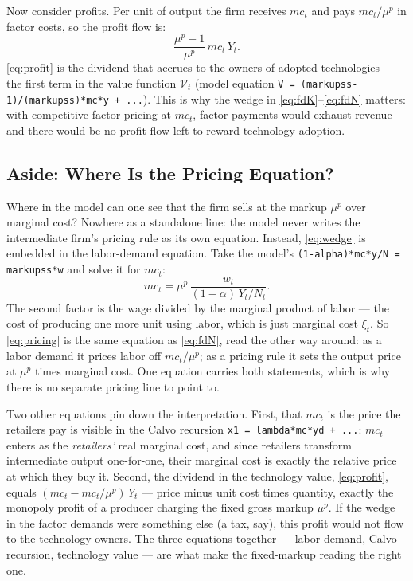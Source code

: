 \documentclass[11pt]{article}
\begin{document}
Now consider profits. Per unit of output the firm receives $mc_t$ and pays
$mc_t/\mu^{p}$ in factor costs, so the profit flow is:
\begin{equation}\label{eq:profit}
    \frac{\mu^{p}-1}{\mu^{p}}\,mc_t\,Y_t.
\end{equation}
\eqref{eq:profit} is the dividend that accrues to the owners of adopted
technologies --- the first term in the value function $\mathcal{V}_t$ (model
equation \texttt{V = (markupss-1)/(markupss)*mc*y + ...}). This is why the wedge in
\eqref{eq:fdK}--\eqref{eq:fdN} matters: with competitive factor pricing at $mc_t$,
factor payments would exhaust revenue and there would be no profit flow left to
reward technology adoption.

\subsection{Aside: Where Is the Pricing Equation?}

Where in the model can one see that the firm sells at the markup $\mu^{p}$ over
marginal cost? Nowhere as a standalone line: the model never writes the
intermediate firm's pricing rule as its own equation. Instead, \eqref{eq:wedge} is
embedded in the labor-demand equation. Take the model's
\texttt{(1-alpha)*mc*y/N = markupss*w} and solve it for $mc_t$:
\begin{equation}\label{eq:pricing}
    mc_t = \mu^{p}\,\frac{w_t}{(1-\alpha)\,Y_t/N_t}.
\end{equation}
The second factor is the wage divided by the marginal product of labor --- the cost
of producing one more unit using labor, which is just marginal cost $\xi_t$. So
\eqref{eq:pricing} is the same equation as \eqref{eq:fdN}, read the other way
around: as a labor demand it prices labor off $mc_t/\mu^{p}$; as a pricing rule it
sets the output price at $\mu^{p}$ times marginal cost. One equation carries both
statements, which is why there is no separate pricing line to point to.

Two other equations pin down the interpretation. First, that $mc_t$ is the price
the retailers pay is visible in the Calvo recursion
\texttt{x1 = lambda*mc*yd + ...}: $mc_t$ enters as the \emph{retailers'} real
marginal cost, and since retailers transform intermediate output one-for-one,
their marginal cost is exactly the relative price at which they buy it. Second,
the dividend in the technology value, \eqref{eq:profit}, equals
$(mc_t - mc_t/\mu^{p})\,Y_t$ --- price minus unit cost times quantity, exactly the
monopoly profit of a producer charging the fixed gross markup $\mu^{p}$. If the
wedge in the factor demands were something else (a tax, say), this profit would
not flow to the technology owners. The three equations together --- labor demand,
Calvo recursion, technology value --- are what make the fixed-markup reading the
right one.
\end{document}
